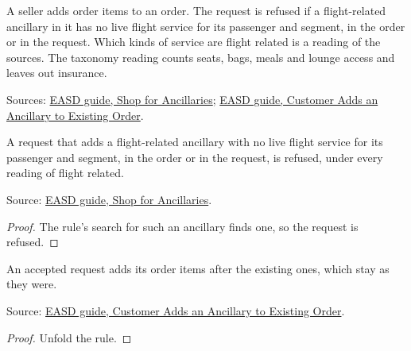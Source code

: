 \begin{definition}
  \label{def:ancillaries-add-services}
  A seller adds order items to an order.  The request is refused if a
  flight-related ancillary in it has no live flight service for its
  passenger and segment, in the order or in the request.  Which kinds of
  service are flight related is a reading of the sources.  The taxonomy
  reading counts seats, bags, meals and lounge access and leaves out
  insurance.

  Sources: \href{https://standards.atlassian.net/wiki/spaces/EASD/pages/574226524}{EASD guide, Shop for Ancillaries};
  \href{https://standards.atlassian.net/wiki/spaces/EASD/pages/842301482}{EASD guide, Customer Adds an Ancillary to Existing Order}.
\end{definition}

\begin{theorem}
  \label{thm:ancillaries-add-refuses-without-flight}
  A request that adds a flight-related ancillary with no live flight service
  for its passenger and segment, in the order or in the request, is
  refused, under every reading of flight related.

  Source: \href{https://standards.atlassian.net/wiki/spaces/EASD/pages/574226524}{EASD guide, Shop for Ancillaries}.
\end{theorem}
\begin{proof}
  The rule's search for such an ancillary finds one, so the request is
  refused.
\end{proof}

\begin{theorem}
  \label{thm:ancillaries-add-appends}
  An accepted request adds its order items after the existing ones, which
  stay as they were.

  Source: \href{https://standards.atlassian.net/wiki/spaces/EASD/pages/842301482}{EASD guide, Customer Adds an Ancillary to Existing Order}.
\end{theorem}
\begin{proof}
  Unfold the rule.
\end{proof}

